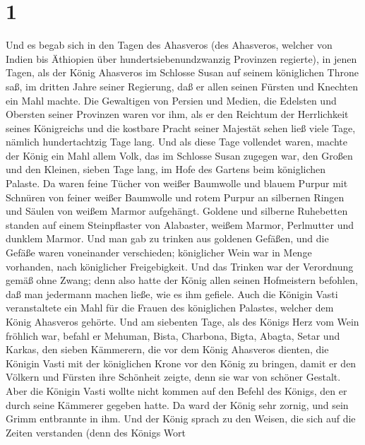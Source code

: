 \hypertarget{section}{%
\section{1}\label{section}}

 Und es begab sich in den Tagen des Ahasveros (des
Ahasveros, welcher von Indien bis Äthiopien über hundertsiebenundzwanzig
Provinzen regierte),  in jenen Tagen, als der König
Ahasveros im Schlosse Susan auf seinem königlichen Throne saß,
 im dritten Jahre seiner Regierung, daß er allen seinen
Fürsten und Knechten ein Mahl machte. Die Gewaltigen von Persien und
Medien, die Edelsten und Obersten seiner Provinzen waren vor ihm,
 als er den Reichtum der Herrlichkeit seines Königreichs
und die kostbare Pracht seiner Majestät sehen ließ viele Tage, nämlich
hundertachtzig Tage lang.  Und als diese Tage vollendet
waren, machte der König ein Mahl allem Volk, das im Schlosse Susan
zugegen war, den Großen und den Kleinen, sieben Tage lang, im Hofe des
Gartens beim königlichen Palaste.  Da waren feine Tücher
von weißer Baumwolle und blauem Purpur mit Schnüren von feiner weißer
Baumwolle und rotem Purpur an silbernen Ringen und Säulen von weißem
Marmor aufgehängt. Goldene und silberne Ruhebetten standen auf einem
Steinpflaster von Alabaster, weißem Marmor, Perlmutter und dunklem
Marmor.  Und man gab zu trinken aus goldenen Gefäßen, und
die Gefäße waren voneinander verschieden; königlicher Wein war in Menge
vorhanden, nach königlicher Freigebigkeit.  Und das
Trinken war der Verordnung gemäß ohne Zwang; denn also hatte der König
allen seinen Hofmeistern befohlen, daß man jedermann machen ließe, wie
es ihm gefiele.  Auch die Königin Vasti veranstaltete ein
Mahl für die Frauen des königlichen Palastes, welcher dem König
Ahasveros gehörte.  Und am siebenten Tage, als des Königs
Herz vom Wein fröhlich war, befahl er Mehuman, Bista, Charbona, Bigta,
Abagta, Setar und Karkas, den sieben Kämmerern, die vor dem König
Ahasveros dienten,  die Königin Vasti mit der königlichen
Krone vor den König zu bringen, damit er den Völkern und Fürsten ihre
Schönheit zeigte, denn sie war von schöner Gestalt.  Aber
die Königin Vasti wollte nicht kommen auf den Befehl des Königs, den er
durch seine Kämmerer gegeben hatte. Da ward der König sehr zornig, und
sein Grimm entbrannte in ihm.  Und der König sprach zu
den Weisen, die sich auf die Zeiten verstanden (denn des Königs Wort
